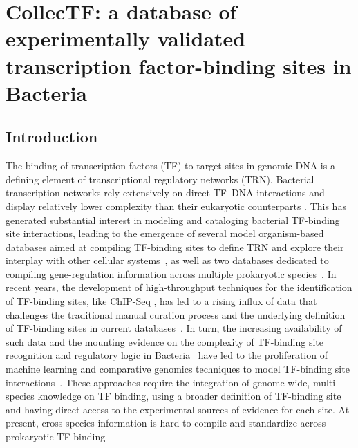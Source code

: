 

\chapter{CollecTF: a database of experimentally validated transcription
  factor-binding sites in Bacteria}
\label{chap:collectf}

\section{Introduction}


The binding of transcription factors (TF) to target sites in genomic DNA is a
defining element of transcriptional regulatory networks (TRN). Bacterial
transcription networks rely extensively on direct TF–DNA interactions and
display relatively lower complexity than their eukaryotic counterparts
\citep{wunderlich2009different, remenyi2004combinatorial}. This has generated
substantial interest in modeling and cataloging bacterial TF-binding site
interactions, leading to the emergence of several model organism-based
databases aimed at compiling TF-binding sites to define TRN and explore their
interplay with other cellular systems~\citep{salgado2013regulondb,
  jacques2005mtbreglist, pauling2012coryneregnet, sierro2008dbtbs}, as well as
two databases dedicated to compiling gene-regulation information across
multiple prokaryotic species~\citep{munch2005virtual,
  kazakov2007regtransbase}. In recent years, the development of high-throughput
techniques for the identification of TF-binding sites, like ChIP-Seq
\citep{mardis2007chip}, has led to a rising influx of data that challenges the
traditional manual curation process and the underlying definition of TF-binding
sites in current databases~\citep{salgado2013regulondb}. In turn, the increasing
availability of such data and the mounting evidence on the complexity of
TF-binding site recognition and regulatory logic in
Bacteria~\citep{hijum2009mechanisms, paul2007integration, barnard2004regulation}
have led to the proliferation of machine learning and comparative genomics
techniques to model TF-binding site interactions~\citep{narlikar2013mumod,
  maienschein2012improved, zwir2005dissecting}. These approaches require the
integration of genome-wide, multi-species knowledge on TF binding, using a
broader definition of TF-binding site and having direct access to the
experimental sources of evidence for each site. At present, cross-species
information is hard to compile and standardize across prokaryotic TF-binding

